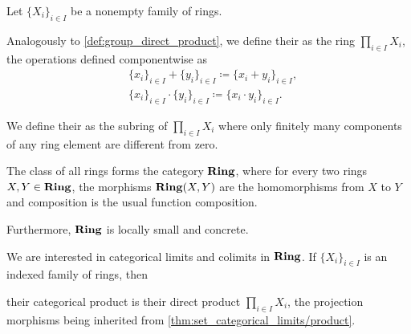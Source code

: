 \begin{definition}\label{def:ring_direct_product}
  Let \( \{ X_i \}_{i \in I} \) be a nonempty family of rings.

  Analogously to \cref{def:group_direct_product}, we define their  as the ring \( \prod_{i \in I} X_i \), the operations defined componentwise as
  \begin{align*}
    &\{ x_i \}_{i \in I} + \{ y_i \}_{i \in I}
    \coloneqq
    \{ x_i + y_i \}_{i \in I}, \\
    &\{ x_i \}_{i \in I} \cdot \{ y_i \}_{i \in I}
    \coloneqq
    \{ x_i \cdot y_i \}_{i \in I}.
  \end{align*}

  We define their  as the subring of \( \prod_{i \in I} X_i \) where only finitely many components of any ring element are different from zero.
\end{definition}

\begin{definition}\label{def:category_of_rings}
  The class of all rings forms the category \( \operatorname{\mathbf{Ring}} \), where for every two rings \( X, Y \in \operatorname{\mathbf{Ring}} \), the morphisms \( \operatorname{\mathbf{Ring}}(X, Y) \) are the homomorphisms from \( X \) to \( Y \) and composition is the usual function composition.

  Furthermore, \( \operatorname{\mathbf{Ring}} \) is locally small and concrete.
\end{definition}

\begin{proposition}\label{thm:ring_categorical_limits}
  We are interested in categorical limits and colimits in \( \operatorname{\mathbf{Ring}} \). If \( \{ X_i \}_{i \in I} \) is an indexed family of rings, then
  \begin{defenum}
    \item\label{thm:ring_categorical_limits/product} their categorical product is their direct product \( \prod_{i \in I} X_i \), the projection morphisms being inherited from \cref{thm:set_categorical_limits/product}.
  \end{defenum}
\end{proposition}
